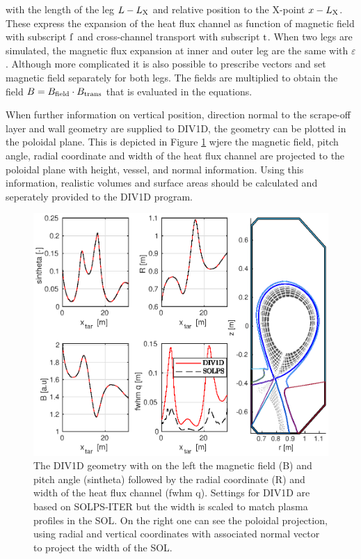 \documentclass[amsmath,amssymb,a4]{revtex4-2}
\begin{document}
with the length of the leg $L - L_{\rm X}$ and relative position to the X-point $x-L_{\rm X}$. These express the expansion of the heat flux channel as function of magnetic field with subscript $\rm f$ and cross-channel transport with subscript $\rm t$. When two legs are simulated, the magnetic flux expansion at inner and outer leg are the same with $\varepsilon$. Although more complicated it is also possible to prescribe vectors and set magnetic field separately for both legs. The fields are multiplied to obtain the field $B=B_{\rm field} \cdot B_{\rm trans}$ that is evaluated in the equations.  

\noindent When further information on vertical position, direction normal to the scrape-off layer and wall geometry are supplied to DIV1D, the geometry can be plotted in the poloidal plane. This is depicted in Figure \ref{fig:div1d-geometry} wjere the magnetic field, pitch angle, radial coordinate and width of the heat flux channel are projected to the poloidal plane with height, vessel, and normal information. Using this information, realistic volumes and surface areas should be calculated and seperately provided to the DIV1D program.
\begin{figure}[h]
    \centering
    \includegraphics[width=\linewidth]{div1d_geometry.eps}
    \caption{The DIV1D geometry with on the left the magnetic field (B) and pitch angle (sintheta) followed by the radial coordinate (R) and width of the heat flux channel (fwhm q). Settings for DIV1D are based on SOLPS-ITER but the width is scaled to match plasma profiles in the SOL. On the right one can see the poloidal projection, using radial and vertical coordinates with associated normal vector to project the width of the SOL.}
    \label{fig:div1d-geometry}
\end{figure}
\end{document}
